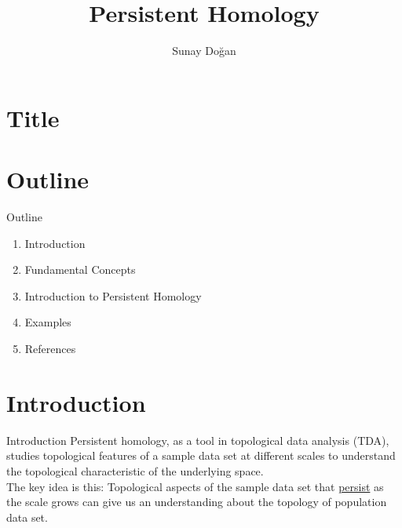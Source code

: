 \documentclass{beamer}
\title[Mathematics Department]{Persistent Homology}
\author{Sunay Doğan}
\institute{METU}
\date{}
\begin{document}
\section{Title}
\begin{frame}
    \titlepage
\end{frame}
\section{Outline}
\begin{frame}{Outline}

    \begin{enumerate}
        \item Introduction
        \item Fundamental Concepts
        \item Introduction to Persistent Homology
        \item Examples
        \item References
    \end{enumerate}
    
\end{frame}

\section{Introduction}
\begin{frame}{Introduction}
    Persistent homology, as a tool in topological data analysis (TDA), studies topological features of a sample data set at different scales to understand the topological characteristic of the underlying space.\\
    \vspace*{0.5cm}
    The key idea is this: Topological aspects of the sample data set that \underline{persist} as the scale grows can give us an understanding about the topology of population data set. 
\end{frame}
\end{document}
